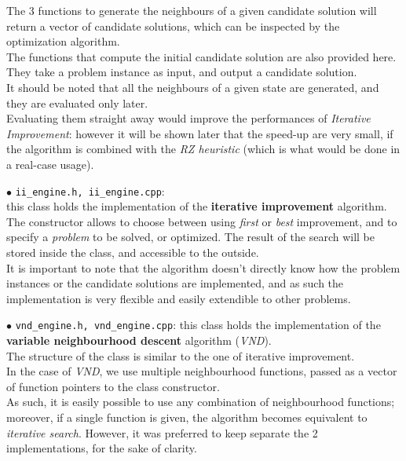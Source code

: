 \documentclass[
12pt,
a4paper,
oneside,
headinclude,
footinclude]{article}
\theoremstyle{definition} %
\begin{document}
The 3 functions to generate the neighbours of a given candidate solution will return a vector of candidate solutions, which can be inspected by the optimization algorithm.\\
The functions that compute the initial candidate solution are also provided here. 
They take a problem instance as input, and output a candidate solution.\\
It should be noted that all the neighbours of a given state are generated, and they are evaluated only later.\\
Evaluating them straight away would improve the performances of \textit{Iterative Improvement}: however it will be shown later that the speed-up are very small, if the algorithm is combined with the \textit{RZ heuristic} (which is what would be done in a real-case usage).

$\bullet$ \texttt{ii\_engine.h, ii\_engine.cpp}:\\
this class holds the implementation of the \textbf{iterative improvement} algorithm.\\
The constructor allows to choose between using \textit{first} or \textit{best} improvement, and to specify a \textit{problem} to be solved, or optimized.
The result of the search will be stored inside the class, and accessible to the outside.\\
It is important to note that the algorithm doesn't directly know how the problem instances or the candidate solutions are implemented, and as such the implementation is very flexible and easily extendible to other problems.

$\bullet$ \texttt{vnd\_engine.h, vnd\_engine.cpp}:
this class holds the implementation of the \textbf{variable neighbourhood descent} algorithm (\textit{VND}).\\
The structure of the class is similar to the one of iterative improvement.\\
In the case of \textit{VND}, we use multiple neighbourhood functions, passed as a vector of function pointers to the class constructor.\\
As such, it is easily possible to use any combination of neighbourhood functions; moreover, if a single function is given, the algorithm becomes equivalent to \textit{iterative search}. 
However, it was preferred to keep separate the 2 implementations, for the sake of clarity.




\end{document}

